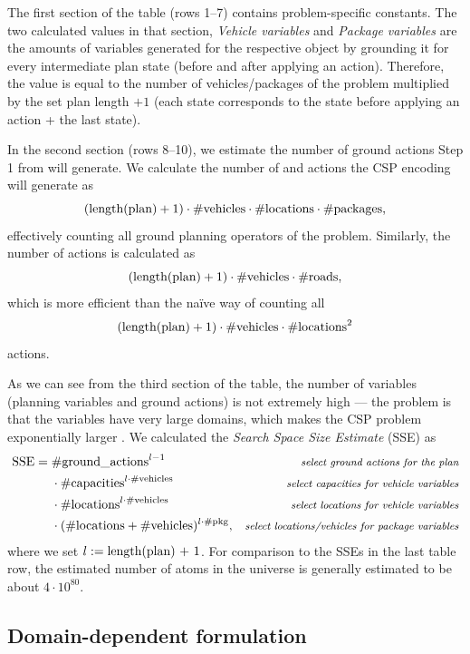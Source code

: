 The first section of the table (rows 1--7) contains problem-specific constants.
The two calculated values in that section, \textit{Vehicle variables} and \textit{Package variables} are the amounts of variables generated for the respective
object by grounding it for every intermediate plan state (before and after applying an action). Therefore, the value is equal to the number of vehicles/packages of the problem
multiplied by the set plan length $+ 1$ (each state corresponds to the state before applying an action + the last state).

In the second section (rows 8--10), we estimate the number of ground actions
Step 1 from \citet[Section~8.3.1]{Ghallab2004} will generate.
We calculate the number of \pickup{} and \drop{} actions the CSP encoding will generate
as $$(\textrm{length(plan)} + 1) \cdot \textrm{\#vehicles} \cdot \textrm{\#locations} \cdot \textrm{\#packages},$$
effectively counting all ground planning operators of the problem. Similarly,
the number of \drive{} actions is calculated as
$$(\textrm{length(plan)} + 1) \cdot \textrm{\#vehicles} \cdot \textrm{\#roads},$$
which is more efficient than the na{\"{i}}ve way of
counting all
$$(\textrm{length(plan)} + 1) \cdot \textrm{\#vehicles} \cdot \textrm{\#locations}^2$$
actions.

As we can see from the third section of the table, the number of variables
(planning variables and ground actions) is not extremely high
--- the problem is that the variables have very large domains,
which makes the CSP problem exponentially larger \citep[Section~8.3.2]{Ghallab2004}.
We calculated the \textit{Search Space Size Estimate} (SSE) as
\begin{align*}
\textrm{SSE} =\; &\textrm{\#ground\_actions}^{l-1} & \textit{\footnotesize select ground actions for the plan}\\
&\cdot \textrm{\#capacities}^{l \cdot \textrm{\#vehicles}} & \textit{\footnotesize select capacities for vehicle variables}\\
&\cdot \textrm{\#locations}^{l \cdot \textrm{\#vehicles}} & \textit{\footnotesize select locations for vehicle variables}\\
&\cdot (\textrm{\#locations} + \textrm{\#vehicles})^{l \cdot \textrm{\#pkg}}, & \textit{\footnotesize select locations/vehicles for package variables}
\end{align*}
where we set $l := \textrm{length(plan) + 1}$.
For comparison to the SSEs in the last table row, 
the estimated number of atoms in the universe is generally estimated to be about $4 \cdot 10^{80}$.

\subsection{Domain-dependent formulation}\label{csp-custom-repr}

